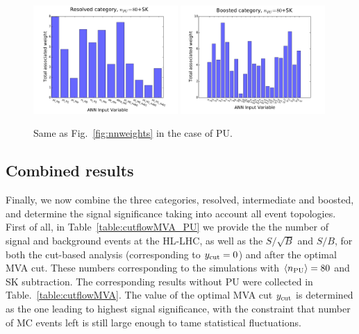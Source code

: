 \begin{figure}[t]
\begin{center}
\includegraphics[width=0.49\textwidth]{plots/res_wgthist_SKPU80.pdf}
\includegraphics[width=0.49\textwidth]{plots/bst_wgthist_SKPU80.pdf}
\vspace{-0.5cm}
\caption{\small
Same as Fig.~\ref{fig:nnweights} in the case of PU.
}
\label{fig:nnweights_PU}
\end{center}
\end{figure}




\subsection{Combined results}

Finally, we now combine the three categories, resolved,
intermediate and boosted, and determine the signal
significance taking into account all event topologies.
%
First of all, in Table~\ref{table:cutflowMVA_PU}
we provide the  the number of signal and
    background events at the HL-LHC, as well as the $S/\sqrt{B}$ and $S/B$,
    for both the cut-based analysis (corresponding
    to $y_{\rm cut}=0$) and after the
    optimal MVA cut.
    These numbers corresponding to the simulations
    with $\left\langle n_{\rm PU}\right\rangle=80$
    and SK subtraction.
    The corresponding results without PU were collected
    in Table.~\ref{table:cutflowMVA}.
    The value of the optimal MVA cut $y_{\rm cut}$ is determined
    as the one leading to highest signal significance, with
    the constraint that number of MC events left is still large
    enough to tame statistical fluctuations.


